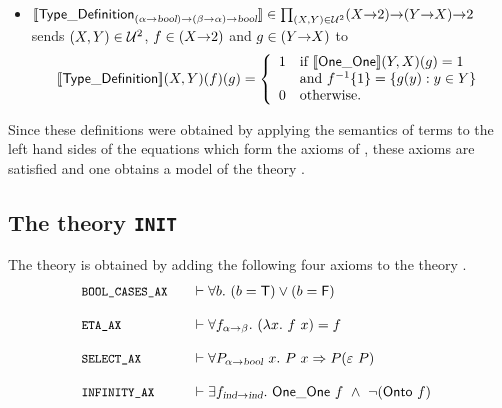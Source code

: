 \begin{itemize}
\item $[\![{\sf Type\_Definition}_{(\alpha{\to}\textsl{bool}){\to}(\beta{\to}\alpha){\to}\textsl{bool}}]\!]\in
 \prod_{(X,Y)\in{\cal U}^{2}} (X{\to}\mbox{\rm 2}){\to}(Y{\to} X){\to}\mbox{\rm 2}$ \\
 sends $(X,Y)\in{\cal U}^{2}$, $f\in(X{\to}\mbox{\rm 2})$ and $g\in(Y{\to} X)$  to
 \[ [\![{\sf Type\_Definition}]\!](X,Y)(f)(g) = \left\{ \begin{array}{ll}
                                        1 & \mbox{if
                                            $[\![{\sf One\_One}]\!](Y,X)(g)=1$}\\
                                          & \mbox{and $f^{-1}\{1\}=
                                            \{g(y) : y\in Y\}$} \\
                                        0 & \mbox{otherwise.}
                                       \end{array}
                               \right.
\]
\end{itemize}
Since these definitions were obtained by applying the semantics of
terms to the left hand sides of the equations which form the axioms of
, these axioms are satisfied and one obtains a model of
the theory .


\subsection{The theory {\tt INIT}}
\label{INIT}

The theory  is
obtained by adding the following four axioms to the theory
.
\[
\index{BOOL_CASES_AX@\ml{BOOL\_CASES\_AX}!abstract form of}
\index{ETA_AX@\ml{ETA\_AX}!abstract form of}
\index{SELECT_AX@\ml{SELECT\_AX}!abstract form of}
\index{INFINITY_AX@\ml{INFINITY\_AX}!abstract form of}
\index{choice axiom!abstract form of}
\index{axiom of infinity!abstract form of}
\begin{array}{@{}l@{\qquad}l}
\mbox{\small\tt BOOL\_CASES\_AX}&\vdash \uquant{b} (b = \T ) \vee (b = \F )\\
 \\
\mbox{\small\tt ETA\_AX}&
\vdash \uquant{f_{\alpha\fun\beta}}(\lquant{x}f\ x) = f\\
 \\
\mbox{\small\tt SELECT\_AX}&
\vdash \uquant{P_{\alpha\fun\ty{bool}}\ x} P\ x \imp
P({\hilbert}\ P)\\
  \\
\mbox{\small\tt INFINITY\_AX}&
\vdash \equant{f_{\ind\fun \ind}} \OneOne \ f \conj \neg(\Onto \ f)\\
\end{array}
\]

